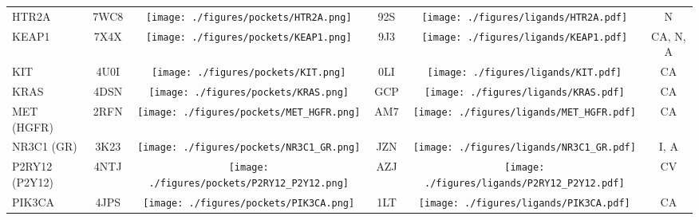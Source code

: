 \begin{ThreePartTable}
\begin{longtable}{ l @{\extracolsep{\fill}} *{5}{c} }
HTR2A                                 & 7WC8            &      \texttt{[image: ./figures/pockets/HTR2A.png]}                     & 92S                    &\texttt{[image: ./figures/ligands/HTR2A.pdf]}                                               & N                             \\
KEAP1                                 & 7X4X            &      \texttt{[image: ./figures/pockets/KEAP1.png]}                     & 9J3                    &\texttt{[image: ./figures/ligands/KEAP1.pdf]}                                               & CA, N, A \\
KIT                                   & 4U0I            &      \texttt{[image: ./figures/pockets/KIT.png]}                     & 0LI                    &\texttt{[image: ./figures/ligands/KIT.pdf]}                                               & CA                                              \\
KRAS                                  & 4DSN            &      \texttt{[image: ./figures/pockets/KRAS.png]}                     & GCP                    &\texttt{[image: ./figures/ligands/KRAS.pdf]}                                               & CA                                              \\
MET (HGFR)                            & 2RFN            &      \texttt{[image: ./figures/pockets/MET\_HGFR.png]}                     & AM7                    &\texttt{[image: ./figures/ligands/MET\_HGFR.pdf]}                                               & CA                                              \\
NR3C1 (GR)                            & 3K23            &        \texttt{[image: ./figures/pockets/NR3C1\_GR.png]}                   & JZN                    &\texttt{[image: ./figures/ligands/NR3C1\_GR.pdf]}                                             & I, A              \\
P2RY12 (P2Y12)                        & 4NTJ            &        \texttt{[image: ./figures/pockets/P2RY12\_P2Y12.png]}                   & AZJ                    &\texttt{[image: ./figures/ligands/P2RY12\_P2Y12.pdf]}                                             & CV                              \\
PIK3CA                                & 4JPS            &         \texttt{[image: ./figures/pockets/PIK3CA.png]}                  & 1LT                    &\texttt{[image: ./figures/ligands/PIK3CA.pdf]}                                            & CA                                              \\

\end{longtable}
\end{ThreePartTable}
